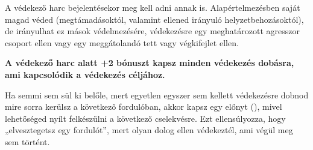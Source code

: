 A védekező harc bejelentésekor meg kell adni annak  is. Alapértelmezésben saját magad véded (megtámadásoktól, valamint ellened irányuló helyzetbehozásoktól), de irányulhat ez mások védelmezésére, védekezésre egy meghatározott agresszor csoport ellen vagy egy meggátolandó tett vagy végkifejlet ellen.

\textbf{A védekező harc alatt +2 bónuszt kapsz minden védekezés dobásra, ami kapcsolódik a védekezés céljához.}

Ha semmi sem sül ki belőle, mert egyetlen egyszer sem kellett védekezésre dobnod mire sorra kerülsz a következő fordulóban, akkor kapsz egy előnyt (), mivel lehetőséged nyílt felkészülni a következő cselekvésre. Ezt ellensúlyozza, hogy „elvesztegetsz egy fordulót”, mert olyan dolog ellen védekeztél, ami végül meg sem történt.
